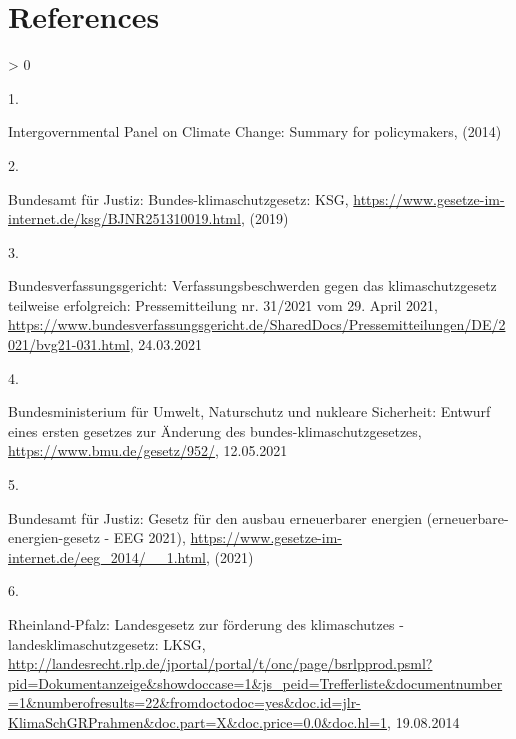 \documentclass[a4paper,11pt]{article}
\newlength{\cslhangindent}
\newlength{\csllabelwidth}
\newenvironment{CSLReferences}[3] %
 {%
  \setlength{\parindent}{0pt}
  \ifodd #1 \everypar{\setlength{\hangindent}{\cslhangindent}}\ignorespaces\fi
  \ifnum #2 > 0
  \setlength{\parskip}{#2\baselineskip}
  \fi
 }%
 {}
\newcommand{\CSLLeftMargin}[1]{\parbox[t]{\maxof{\widthof{#1}}{\csllabelwidth}}{#1}}
\newcommand{\CSLRightInline}[1]{\parbox[t]{\linewidth}{#1}}
\begin{document}
\hypertarget{references}{%
\section*{References}\label{references}}

\noindent

\setlength{\parindent}{-0.5cm}
\setlength{\leftskip}{0.5cm}
\setlength{\parskip}{8pt}

\hypertarget{refs}{}
\begin{CSLReferences}{0}{0}
\leavevmode\hypertarget{ref-IntergovernmentalPanelonClimateChange.2014}{}%
\CSLLeftMargin{1. }
\CSLRightInline{Intergovernmental Panel on Climate Change: Summary for policymakers, (2014)}

\leavevmode\hypertarget{ref-BundesamtfurJustiz.2019}{}%
\CSLLeftMargin{2. }
\CSLRightInline{Bundesamt für Justiz: Bundes-klimaschutzgesetz: KSG, \url{https://www.gesetze-im-internet.de/ksg/BJNR251310019.html}, (2019)}

\leavevmode\hypertarget{ref-Bundesverfassungsgericht.24.03.2021}{}%
\CSLLeftMargin{3. }
\CSLRightInline{Bundesverfassungsgericht: Verfassungsbeschwerden gegen das klimaschutzgesetz teilweise erfolgreich: Pressemitteilung nr. 31/2021 vom 29. April 2021, \url{https://www.bundesverfassungsgericht.de/SharedDocs/Pressemitteilungen/DE/2021/bvg21-031.html}, 24.03.2021}

\leavevmode\hypertarget{ref-BundesministeriumfurUmweltNaturschutzundnukleareSicherheit.12.05.2021}{}%
\CSLLeftMargin{4. }
\CSLRightInline{Bundesministerium für Umwelt, Naturschutz und nukleare Sicherheit: Entwurf eines ersten gesetzes zur {Ä}nderung des bundes-klimaschutzgesetzes, \url{https://www.bmu.de/gesetz/952/}, 12.05.2021}

\leavevmode\hypertarget{ref-BundesamtfurJustiz.2021}{}%
\CSLLeftMargin{5. }
\CSLRightInline{Bundesamt für Justiz: Gesetz f{ü}r den ausbau erneuerbarer energien (erneuerbare-energien-gesetz - EEG 2021), \url{https://www.gesetze-im-internet.de/eeg_2014/__1.html}, (2021)}

\leavevmode\hypertarget{ref-RheinlandPfalz.19.08.2014}{}%
\CSLLeftMargin{6. }
\CSLRightInline{Rheinland-Pfalz: Landesgesetz zur f{ö}rderung des klimaschutzes - landesklimaschutzgesetz: LKSG, \url{http://landesrecht.rlp.de/jportal/portal/t/onc/page/bsrlpprod.psml?pid=Dokumentanzeige\&showdoccase=1\&js_peid=Trefferliste\&documentnumber=1\&numberofresults=22\&fromdoctodoc=yes\&doc.id=jlr-KlimaSchGRPrahmen\&doc.part=X\&doc.price=0.0\&doc.hl=1}, 19.08.2014}


\end{CSLReferences}
\end{document}
